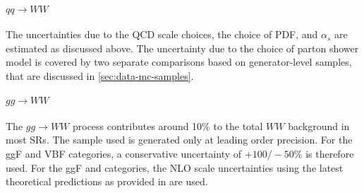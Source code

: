 \paragraph{$qq \to WW$} 
The uncertainties due to the QCD scale choices, the choice of PDF, and $\alpha_s$ are estimated as discussed above.
The uncertainty due to the choice of parton shower model is covered by two separate comparisons based on generator-level samples, that are discussed in \cref{sec:data-mc-samples}. 

\paragraph{$gg \to WW$} 
The $gg \to WW$ process contributes around 10\% to the total $WW$ background in most SRs. The \Sherpa sample used is generated only at leading order precision. For the ggF and VBF \TwoJet categories, a conservative uncertainty of $+100/-50$\% is therefore used. For the ggF \OneJet and \TwoJet categories, the NLO scale uncertainties using the latest theoretical predictions as provided in  are used.

